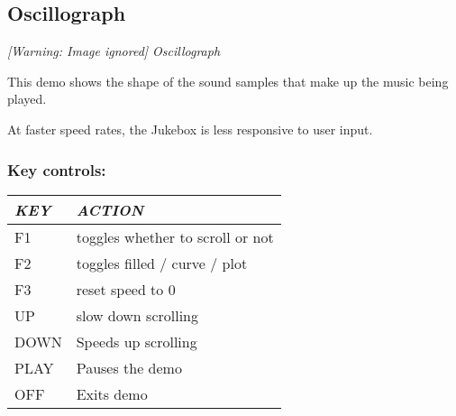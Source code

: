 \subsection{Oscillograph}
{\centering\itshape
  [Warning: Image ignored] %
 \newline
Oscillograph
\par}

This demo shows the shape of the sound samples that make up the music
being played.

At faster speed rates, the Jukebox is less responsive to user input.

\subsubsection{Key controls:}

\begin{center}\begin{tabular}{|p{2.217cm}|p{8.205cm}|}
\hline
{\centering\bfseries\itshape
KEY
\par}
&
{\centering\bfseries\itshape
ACTION
\par}
\\\hline
{\centering
F1
\par}
&
toggles whether to scroll or not
\\\hline
{\centering
F2
\par}
&
toggles filled / curve / plot
\\\hline
{\centering
F3
\par}
&
reset speed to 0
\\\hline
{\centering
UP
\par}
&
slow down scrolling
\\\hline
{\centering
DOWN
\par}
&
Speeds up scrolling
\\\hline
{\centering
PLAY
\par}
&
Pauses the demo
\\\hline
{\centering
OFF
\par}
&
Exits demo
\\\hline
\end{tabular}\end{center}

